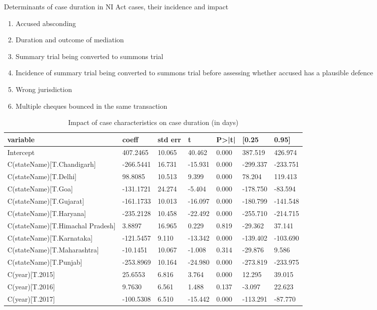 Determinants of case duration in NI Act cases, their incidence and impact
\begin{enumerate}
\item Accused absconding
\item Duration and outcome of mediation
\item Summary trial being converted to summons trial
\item Incidence of summary trial being converted to summons trial
  before assessing whether accused has a plausible defence
\item Wrong jurisdiction
\item Multiple cheques bounced in the same transaction
\end{enumerate}


\begin{longtable}{@{}lllllll@{}}
\caption{Impact of case characteristics on case duration (in days)}
\label{tab:duration_reg}\\
\toprule
variable & coeff & std err & t & P>|t| & [0.25 & 0.95] \\\midrule
\endhead
Intercept & 407.2465 & 10.065 & 40.462 & 0.000 & 387.519 & 426.974 \\
C(stateName)[T.Chandigarh] & -266.5441 & 16.731 & -15.931 & 0.000 & -299.337 & -233.751 \\
C(stateName)[T.Delhi] & 98.8085 & 10.513 & 9.399 & 0.000 & 78.204 & 119.413 \\
C(stateName)[T.Goa] & -131.1721 & 24.274 & -5.404 & 0.000 & -178.750 & -83.594 \\
C(stateName)[T.Gujarat] & -161.1733 & 10.013 & -16.097 & 0.000 & -180.799 & -141.548 \\
C(stateName)[T.Haryana] & -235.2128 & 10.458 & -22.492 & 0.000 & -255.710 & -214.715 \\
C(stateName)[T.Himachal Pradesh] & 3.8897 & 16.965 & 0.229 & 0.819 & -29.362 & 37.141 \\
C(stateName)[T.Karnataka] & -121.5457 & 9.110 & -13.342 & 0.000 & -139.402 & -103.690 \\
C(stateName)[T.Maharashtra] & -10.1451 & 10.067 & -1.008 & 0.314 & -29.876 & 9.586 \\
C(stateName)[T.Punjab] & -253.8969 & 10.164 & -24.980 & 0.000 & -273.819 & -233.975 \\
C(year)[T.2015] & 25.6553 & 6.816 & 3.764 & 0.000 & 12.295 & 39.015 \\
C(year)[T.2016] & 9.7630 & 6.561 & 1.488 & 0.137 & -3.097 & 22.623 \\
C(year)[T.2017] & -100.5308 & 6.510 & -15.442 & 0.000 & -113.291 & -87.770 \\

\end{longtable}
